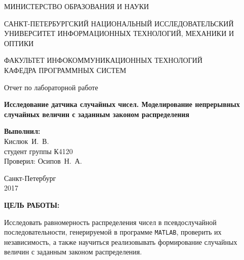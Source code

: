 \documentclass[14pt,a4paper]{extreport}
\newcommand{\header}[1]{%
{
\clearpage%
\fontsize{16pt}{14pt}\selectfont
\begin{center}
\textbf{\MakeUppercase{#1}:}
\end{center}
}
}
\newcommand{\labyear}{2017}
\newcommand{\labtitle}{Исследование датчика случайных чисел. Моделирование непрерывных случайных величин с заданным законом распределения}
\newcommand{\prepod}{Осипов~Н.~А.}
\newcommand{\student}{Кислюк~И.~В.}
\newcommand{\matlab}{\texttt{\MakeUppercase{matlab}}}
\begin{document}
	\begin{titlepage}
	\begin{center}	
		\fontsize{14pt}{14pt}\selectfont
		МИНИСТЕРСТВО ОБРАЗОВАНИЯ И НАУКИ\\

		\vspace*{0.6\baselineskip}

		\MakeUppercase{Санкт-Петербургский Национальный Исследовательский Университет Информационных технологий, механики и оптики}		
		
		\vspace*{0.6\baselineskip}
		\MakeUppercase{Факультет Инфокоммуникационных технологий}\\
		\MakeUppercase{Кафедра программных систем}
	
		\vspace*{7\baselineskip}
		\fontsize{19pt}{18pt}\selectfont
		Отчет по лабораторной работе
		
		\fontsize{20pt}{18pt}\selectfont
		\textbf{\labtitle}\\
		\vspace*{1.15\baselineskip}
		\end{center}
	
	\vspace*{2\baselineskip}
	\begin{flushright}
	\fontsize{14pt}{14pt}\selectfont
	\textbf{Выполнил:}\\
	\student\\
	студент группы К4120\\
	Проверил: \prepod\\
	\end{flushright}
	
	\vspace{\fill}
	\begin{center}
	Санкт-Петербург\\
	\vspace{-1ex}
	\labyear
	\end{center}
	
\end{titlepage}

\fontsize{14pt}{14pt}\selectfont

\header{Цель работы}

Исследовать равномерность распределения чисел в псевдослучайной последовательности, генерируемой в программе \matlab {}, проверить их независимость, а также научиться реализовывать формирование случайных величин с заданным законом распределения.
\end{document}
